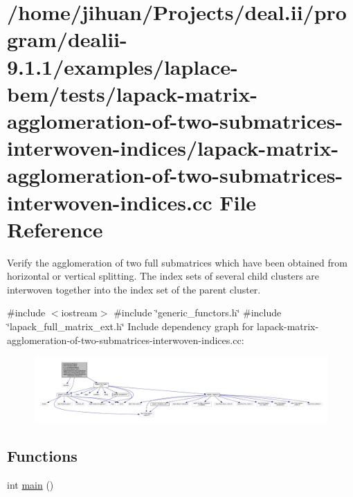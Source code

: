 \hypertarget{lapack-matrix-agglomeration-of-two-submatrices-interwoven-indices_8cc}{}\section{/home/jihuan/\+Projects/deal.ii/program/dealii-\/9.1.1/examples/laplace-\/bem/tests/lapack-\/matrix-\/agglomeration-\/of-\/two-\/submatrices-\/interwoven-\/indices/lapack-\/matrix-\/agglomeration-\/of-\/two-\/submatrices-\/interwoven-\/indices.cc File Reference}
\label{lapack-matrix-agglomeration-of-two-submatrices-interwoven-indices_8cc}


Verify the agglomeration of two full submatrices which have been obtained from horizontal or vertical splitting. The index sets of several child clusters are interwoven together into the index set of the parent cluster.  


{\ttfamily \#include $<$iostream$>$}\newline
{\ttfamily \#include \char`\"{}generic\+\_\+functors.\+h\char`\"{}}\newline
{\ttfamily \#include \char`\"{}lapack\+\_\+full\+\_\+matrix\+\_\+ext.\+h\char`\"{}}\newline
Include dependency graph for lapack-\/matrix-\/agglomeration-\/of-\/two-\/submatrices-\/interwoven-\/indices.cc\+:
\nopagebreak
\begin{figure}[H]
\begin{center}
\leavevmode
\includegraphics[width=350pt]{lapack-matrix-agglomeration-of-two-submatrices-interwoven-indices_8cc__incl}
\end{center}
\end{figure}
\subsection*{Functions}
\begin{DoxyCompactItemize}
\item 
int \hyperlink{lapack-matrix-agglomeration-of-two-submatrices-interwoven-indices_8cc_ae66f6b31b5ad750f1fe042a706a4e3d4}{main} ()
\end{DoxyCompactItemize}


